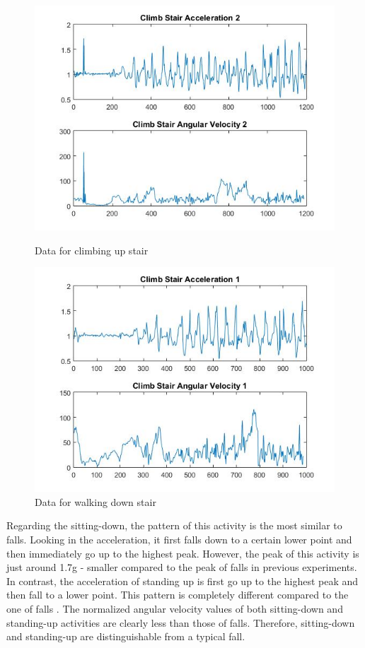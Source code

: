 \documentclass[letterpaper,12pt,titlepage,oneside,final]{book}
\begin{document}
\begin{figure}[h!]
	\centering
	\hspace{-1cm}
	\begin{minipage}[b]{0.5\textwidth}
		\centering
		\includegraphics[scale=0.42]{stair_2}
		\caption{Data for climbing up stair}
	\end{minipage}
	\hfill
	\begin{minipage}[b]{0.5\textwidth}
		\centering
		\includegraphics[scale=0.42]{stair_1}
		\caption{Data for walking down stair}
	\end{minipage}%
\end{figure} \par
Regarding the sitting-down, the pattern of this activity is the most similar to falls. Looking in the acceleration, it first falls down to a certain lower point and then immediately go up to the highest peak. However, the peak of this activity is just around 1.7g - smaller compared to the peak of falls in previous experiments. In contrast, the acceleration of standing up is first go up to the highest peak and then fall to a lower point. This pattern is completely different compared to the one of falls . The normalized angular velocity values of both sitting-down and standing-up activities are clearly less than those of falls. Therefore, sitting-down and standing-up are distinguishable from a typical fall.
\end{document}
